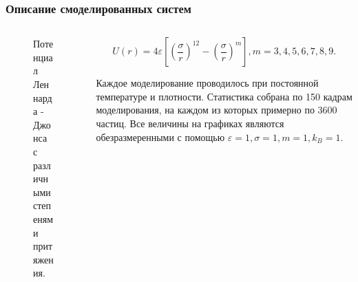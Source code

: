 \documentclass[pdf,hyperref={unicode}]{beamer}
\begin{document}
\begin{frame}
\transdissolve[duration=0.2]
\frametitle{Описание смоделированных систем}

\begin{columns}

\begin{column}{0.5\linewidth}

\begin{figure}[h]

\caption{\tiny Потенциал Леннарда - Джонса с различными степенями притяжения.}
\end{figure}

\end{column}

\begin{column}{0.5\linewidth}
\tiny{

\begin{equation}
U(r) = 4\varepsilon \left[ \left(\frac{\sigma}{r}\right)^{12} - \left(\frac{\sigma}{r}\right)^{m} \right], m = 3, 4, 5, 6, 7, 8, 9.
\label{eqLJ}
\end{equation}

Каждое моделирование проводилось при постоянной температуре и плотности. Статистика собрана по 150 кадрам моделирования, на каждом из которых примерно по 3600 частиц. Все величины на графиках являются обезразмеренными с помощью $\varepsilon = 1, \sigma = 1, m = 1, k_B = 1$.

}
\end{column}
\end{columns}
\end{frame}
\end{document}

